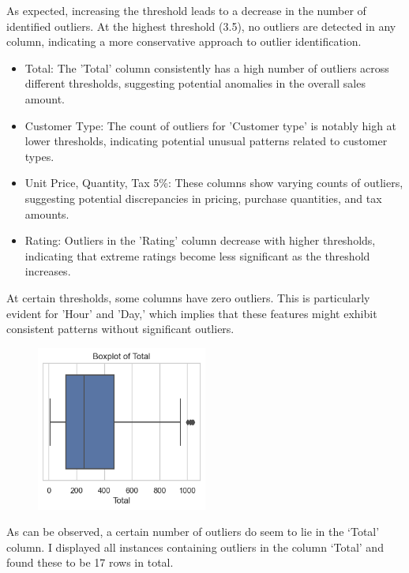 As expected, increasing the threshold leads to a decrease in the number of identified outliers. At the highest threshold (3.5), no outliers are detected in any column, indicating a more conservative approach to outlier identification.

\begin{itemize}
\item Total: The 'Total' column consistently has a high number of outliers across different thresholds, suggesting potential anomalies in the overall sales amount.
\item Customer Type: The count of outliers for 'Customer type' is notably high at lower thresholds, indicating potential unusual patterns related to customer types.
\item Unit Price, Quantity, Tax 5\%: These columns show varying counts of outliers, suggesting potential discrepancies in pricing, purchase quantities, and tax amounts.
\item Rating: Outliers in the 'Rating' column decrease with higher thresholds, indicating that extreme ratings become less significant as the threshold increases.
\end{itemize}
\newline 
At certain thresholds, some columns have zero outliers. This is particularly evident for 'Hour' and 'Day,' which implies that these features might exhibit consistent patterns without significant outliers.


\begin{figure}[h]
    \centering
    \includegraphics[width=0.5\textwidth]{Chapters/ch11/ch11_box_ploy_initial.png}
\end{figure}

As can be observed, a certain number of outliers do seem to lie in the ‘Total’ column. 
\newline
I displayed all instances containing outliers in the column ‘Total’ and found these to be 17 rows in total.


